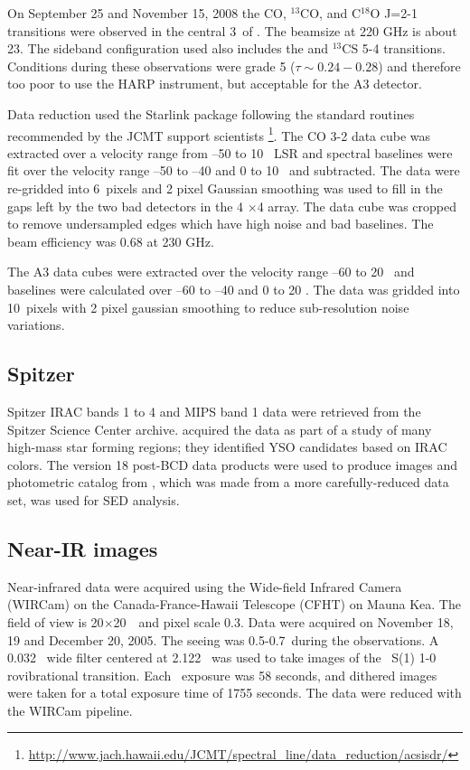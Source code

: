On September 25 and November 15, 2008 the CO, $^{13}$CO, and C$^{18}$O J=2-1
transitions were observed in the central 3\arcmin\ of \region.  The beamsize
at 220 GHz is about 23\arcsec.  The sideband configuration used also includes
the \linebreak \nolinebreak{\so} and $^{13}$CS 5-4 transitions.  Conditions
during these observations were grade 5 ($\tau \sim 0.24-0.28$) and therefore
too poor to use the HARP instrument, but acceptable for the A3 detector.  

Data reduction used the Starlink package following the standard routines
recommended by the JCMT support scientists \footnote{
\url{http://www.jach.hawaii.edu/JCMT/spectral\_line/data\_reduction/acsisdr/}}.
The CO 3-2 data cube was extracted over a velocity range from --50 to 10 \kms\ LSR and
spectral baselines were fit over the velocity range --50 to --40 and 0 to 10
\kms\ and subtracted.  The data were re-gridded into  6\arcsec\  pixels  and 2
pixel Gaussian smoothing was used to fill in the gaps left by the two bad
detectors in the 4 $\times$4 array.   The data cube was cropped to remove
undersampled edges which have high noise and bad baselines.  The beam efficiency
was 0.68 at 230 GHz.

The A3 data cubes were extracted over the velocity range --60 to 20 \kms\ and
baselines were calculated over --60 to --40 and 0 to 20 \kms.  The data
was gridded into 10\arcsec\ pixels with 2 pixel gaussian smoothing to reduce
sub-resolution noise variations.  


\subsection{Spitzer}

Spitzer IRAC bands 1 to 4 and MIPS band 1 data were retrieved from the Spitzer
Science Center archive.  \citet{qiu2008} acquired the data as part of a study
of many high-mass star forming regions; they identified YSO candidates based on
IRAC colors.  The version 18 post-BCD data products were used to produce images
and photometric catalog from \citet{qiu2008}, which was made from a more
carefully-reduced data set, was used for SED analysis.

\subsection{Near-IR images}
Near-infrared data were acquired using the Wide-field Infrared Camera (WIRCam) on
the Canada-France-Hawaii Telescope (CFHT) on Mauna Kea. The field of view is 
20\arcmin$\times$20\arcmin\ ~and pixel scale 0.3\arcsec.  Data were acquired on 
November 18, 19 and December 20, 2005.  The seeing was 0.5-0.7\arcsec\ during the
observations.  A 0.032 \um\ wide filter centered at 2.122 \um\ was used to take images
of the \hh\ S(1) 1-0 rovibrational transition.  Each \hh\ exposure was 58
seconds, and dithered images were taken for a total exposure time of 1755
seconds.  The data were reduced with the WIRCam pipeline.

